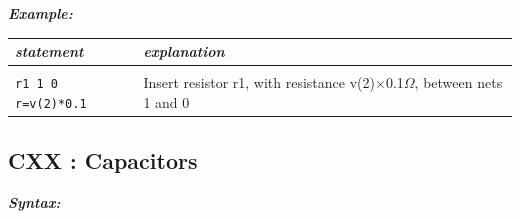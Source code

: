 {\textbf{\textit{Example:}}

\begin{longtable}{l l}
\textit{statement} & \textit{explanation} \\ \hline \\ %
		\begin{minipage}{15em}\texttt{r1 1 0 r={v(2)*0.1}}\end{minipage} 
			& \begin{minipage}{15em}{\small Insert resistor r1, with resistance v(2)$\times$0.1$\Omega$, between nets 1 and 0}\end{minipage} 
\end{longtable}
}


\newpage
\subsection{CXX : Capacitors}
\label{subsec_sceadm_capacitors}

\textbf{\textit{Syntax:}}


